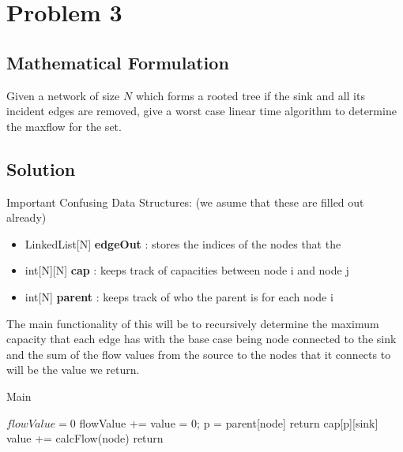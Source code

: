 \documentclass[12pt]{article}
\begin{document}






\section{Problem 3}
\subsection{Mathematical Formulation}
Given a network of size $N$ which forms a rooted tree if the sink and all its incident edges are removed, give a worst
case linear time algorithm to determine the maxflow for the set.


\subsection{Solution}
Important Confusing Data Structures: (we asume that these are filled out already)
\begin{itemize}
    \item LinkedList[N] \textbf{edgeOut} : stores the indices of the nodes that the
    \item int[N][N] \textbf{cap} : keeps track of capacities between node i and node j
    \item int[N] \textbf{parent} : keeps track of who the parent is for each node i
\end{itemize}

The main functionality of this will be to recursively determine the maximum capacity that each edge has with the
base case being node connected to the sink and the sum of the flow values from the source to the nodes that it
connects to will be the value we return.

\begin{algorithm}[H]
\caption{Main}
\begin{algorithmic}
        \State $flowValue = 0$
            \State flowValue += 
        \EndFor
        \State {}
    \EndProcedure
        \State value = 0; p = parent[node]
            \State return cap[p][sink]
        \Else
                \State value += calcFlow(node)
            \EndFor
        \EndIf
        \State return 
    \EndProcedure
\end{algorithmic}
\end{algorithm}
\end{document}
